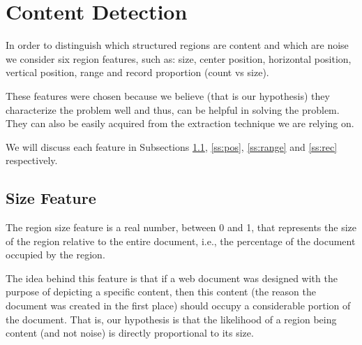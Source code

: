 \section{Content Detection}\label{sec:content}
In order to distinguish which structured regions are content and which are noise
we consider six region features, such as: size, center position, horizontal
position, vertical position, range and record proportion (count vs size).

These features were chosen because we believe (that is our hypothesis) they
characterize the problem well and thus, can be helpful in solving the problem.
They can also be easily acquired from the extraction technique we are relying
on.

We will discuss each feature in Subsections \ref{ss:size}, \ref{ss:pos},
\ref{ss:range} and \ref{ss:rec} respectively.

\subsection{Size Feature}\label{ss:size}
The region size feature is a real number, between 0 and 1, that represents the
size of the region relative to the entire document, i.e., the percentage of the
document occupied by the region.

The idea behind this feature is that if a web document was designed with the
purpose of depicting a specific content, then this content (the reason the
document was created in the first place) should occupy a considerable portion of
the document. That is, our hypothesis is that the likelihood of a region being
content (and not noise) is directly proportional to its size.

